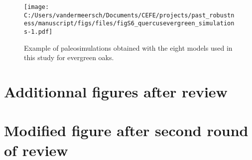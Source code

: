 \documentclass[
]{article}
\begin{document}
\begin{figure}
\centering
\texttt{[image: C:/Users/vandermeersch/Documents/CEFE/projects/past\_robustness/manuscript/figs/files/figS6\_quercusevergreen\_simulations-1.pdf]}
\caption{Example of paleosimulations obtained with the eight models used
in this study for evergreen oaks.}
\end{figure}

\hypertarget{additionnal-figures-after-review}{%
\section{Additionnal figures after
review}\label{additionnal-figures-after-review}}

\hypertarget{modified-figure-after-second-round-of-review}{%
\section{Modified figure after second round of
review}\label{modified-figure-after-second-round-of-review}}
\end{document}
